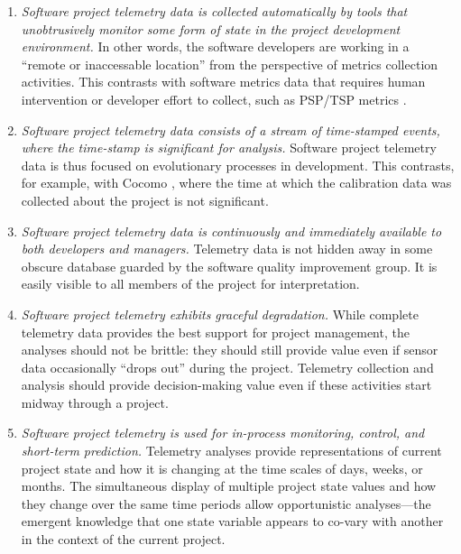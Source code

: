\documentclass[11pt,twocolumn]{article}
\begin{document}
\begin{enumerate}

\item {\em Software project telemetry data is collected automatically by tools
   that unobtrusively monitor some form of state in the project
   development environment.}  In other words, the software developers are
   working in a ``remote or inaccessable location'' from the perspective of
   metrics collection activities. This contrasts with software metrics data
   that requires human intervention or developer effort to collect, such as
   PSP/TSP metrics \cite{Humphrey95}.
        
\item {\em Software project telemetry data consists of a stream of
   time-stamped events, where the time-stamp is significant for analysis.}
   Software project telemetry data is thus focused on evolutionary
   processes in development.  This contrasts, for example, with Cocomo
   \cite{Boehm81}, where the time at which the calibration data was
   collected about the project is not significant.

\item {\em Software project telemetry data is continuously and immediately 
available to both developers and managers.}  Telemetry data is not hidden
away in some obscure database guarded by the software quality improvement
group.  It is easily visible to all members of the project for 
interpretation. 

\item {\em Software project telemetry exhibits graceful degradation.}
While complete telemetry data provides the best support for project
management, the analyses should not be brittle: they should still provide
value even if sensor data occasionally ``drops out'' during the
project. Telemetry collection and analysis should provide decision-making
value even if these activities start midway through a project.
         
\item {\em Software project telemetry is used for in-process
   monitoring, control, and short-term prediction.} Telemetry analyses
   provide representations of current project state and how it is changing
   at the time scales of days, weeks, or months.  The simultaneous display
   of multiple project state values and how they change over the same time
   periods allow opportunistic analyses---the emergent knowledge that one
   state variable appears to co-vary with another in the context of the
   current project.


\end{enumerate}
\end{document}

